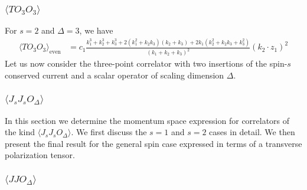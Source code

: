 \documentclass[a4paper,11pt]{article}
\begin{document}
\subsubsection*{$\langle T O_3 O_3 \rangle$}
For $s=2$ and $\Delta=3$, we have
\begin{align}\label{TO3O3}
    \langle T O_3 O_3 \rangle_{\text{even}} &= c_1\frac{k_1^3+k_2^3+k_3^3+2(k_1^2+k_2k_3)(k_2+k_3)+2k_1(k_2^2+k_2k_3+k_3^2)}{(k_1+k_2+k_3)^2}(k_2 \cdot z_1)^2
\end{align}
Let us now consider the three-point correlator with two insertions of the spin-$s$ conserved current and a scalar operator of scaling dimension $\Delta$.
\subsubsection{$\langle J_sJ_sO_{\Delta} \rangle$}
\label{jsjsodeltamomentum}
In this section we determine the momentum space expression for correlators of the kind $\langle J_sJ_sO_{\Delta} \rangle$. We first discuss the $s=1$ and $s=2$ cases in detail. We then present the final result for the general spin case expressed in terms of a transverse polarization tensor.
\subsubsection*{$\langle JJO_{\Delta} \rangle$}
\end{document}
